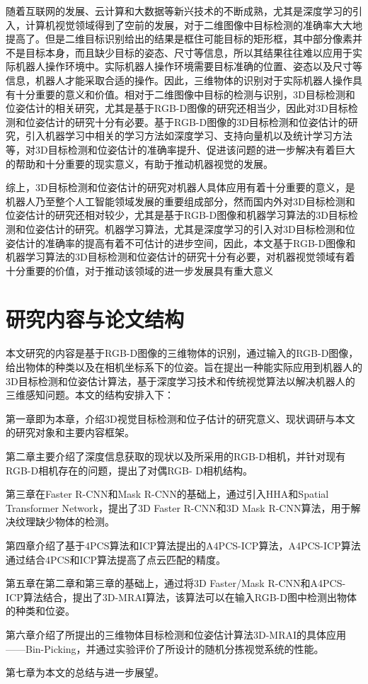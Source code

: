 随着互联网的发展、云计算和大数据等新兴技术的不断成熟，尤其是深度学习的引入，计算机视觉领域得到了空前的发展，对于二维图像中目标检测的准确率大大地提高了。但是二维目标识别给出的结果是框住可能目标的矩形框，其中部分像素并不是目标本身，而且缺少目标的姿态、尺寸等信息，所以其结果往往难以应用于实际机器人操作环境中。实际机器人操作环境需要目标准确的位置、姿态以及尺寸等信息，机器人才能采取合适的操作。因此，三维物体的识别对于实际机器人操作具有十分重要的意义和价值。相对于二维图像中目标的检测与识别，3D目标检测和位姿估计的相关研究，尤其是基于RGB-D图像的研究还相当少，因此对3D目标检测和位姿估计的研究十分有必要。基于RGB-D图像的3D目标检测和位姿估计的研究，引入机器学习中相关的学习方法如深度学习、支持向量机以及统计学习方法等，对3D目标检测和位姿估计的准确率提升、促进该问题的进一步解决有着巨大的帮助和十分重要的现实意义，有助于推动机器视觉的发展。

综上，3D目标检测和位姿估计的研究对机器人具体应用有着十分重要的意义，是机器人乃至整个人工智能领域发展的重要组成部分，然而国内外对3D目标检测和位姿估计的研究还相对较少，尤其是基于RGB-D图像和机器学习算法的3D目标检测和位姿估计的研究。机器学习算法，尤其是深度学习的引入对3D目标检测和位姿估计的准确率的提高有着不可估计的进步空间，因此，本文基于RGB-D图像和机器学习算法的3D目标检测和位姿估计的研究十分有必要，对机器视觉领域有着十分重要的价值，对于推动该领域的进一步发展具有重大意义

\section{研究内容与论文结构}
本文研究的内容是基于RGB-D图像的三维物体的识别，通过输入的RGB-D图像，给出物体的种类以及在相机坐标系下的位姿。旨在提出一种能实际应用到机器人的3D目标检测和位姿估计算法，基于深度学习技术和传统视觉算法以解决机器人的三维感知问题。本文的结构安排入下：

第一章即为本章，介绍3D视觉目标检测和位子估计的研究意义、现状调研与本文的研究对象和主要内容框架。

第二章主要介绍了深度信息获取的现状以及所采用的RGB-D相机，并针对现有RGB-D相机存在的问题，提出了对偶RGB-
D相机结构。

第三章在Faster R-CNN和Mask R-CNN的基础上，通过引入HHA和Spatial Transformer Network，提出了3D Faster R-CNN和3D Mask R-CNN算法，用于解决纹理缺少物体的检测。

第四章介绍了基于4PCS算法和ICP算法提出的A4PCS-ICP算法，A4PCS-ICP算法通过结合4PCS和ICP算法提高了点云匹配的精度。

第五章在第二章和第三章的基础上，通过将3D Faster/Mask R-CNN和A4PCS-ICP算法结合，提出了3D-MRAI算法，该算法可以在输入RGB-D图中检测出物体的种类和位姿。

第六章介绍了所提出的三维物体目标检测和位姿估计算法3D-MRAI的具体应用——Bin-Picking，并通过实验评价了所设计的随机分拣视觉系统的性能。

第七章为本文的总结与进一步展望。

